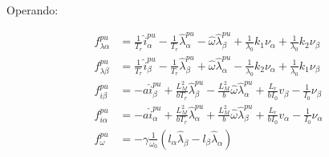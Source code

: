 \documentclass{article}
\begin{document}
            Operando:
            
            \begin{equation}
                \begin{aligned}
                    f_{\lambda\alpha}^{pu} &=  \frac{1}{T_r}  \hat{i}_\alpha^{pu}
                        - \frac{1}{T_r} \hat{\lambda}_\alpha^{pu}  
                        - \hat{\omega} \hat{\lambda}_\beta^{pu} 
                        + \frac{1}{\lambda_0} k_1\nu_\alpha + \frac{1}{\lambda_0} k_2\nu_\beta  \\
                    f_{\lambda\beta}^{pu} &=  \frac{1}{T_r}  \hat{i}_\beta^{pu} 
                        - \frac{1}{T_r} \hat{\lambda}_\beta^{pu}  
                        + \hat{\omega} \hat{\lambda}_\alpha^{pu} 
                        - \frac{1}{\lambda_0} k_2\nu_\alpha + \frac{1}{\lambda_0} k_1\nu_\beta  \\
                    f_{i\beta}^{pu} &=  -a  \hat{i}_\beta^{pu} 
                        + \frac{L_M^2}{b T_r}  \hat{\lambda}_\beta^{pu}  
                        - \frac{L_M^2}{b}  \hat{\omega} \hat{\lambda}_\alpha^{pu}
                        + \frac{L_r}{b I_0} v_\beta 
                        - \frac{1}{I_0} \nu_\beta \\
                    f_{i\alpha}^{pu} &=  -a  \hat{i}_\alpha^{pu} 
                        + \frac{L_M^2}{b T_r}  \hat{\lambda}_\alpha^{pu}  
                        +  \frac{L_M^2}{b} \hat{\omega} \hat{\lambda}_\beta^{pu}
                        + \frac{L_r}{b I_0} v_\alpha
                        - \frac{1}{I_0} \nu_\alpha \\
                    f_\omega^{pu} &=  -\gamma \frac{1}{\omega_0} \left( l_\alpha \hat{\lambda}_\beta 
                        - l_\beta \hat{\lambda}_\alpha  \right)
                \end{aligned}
            \end{equation}
            
\end{document}
